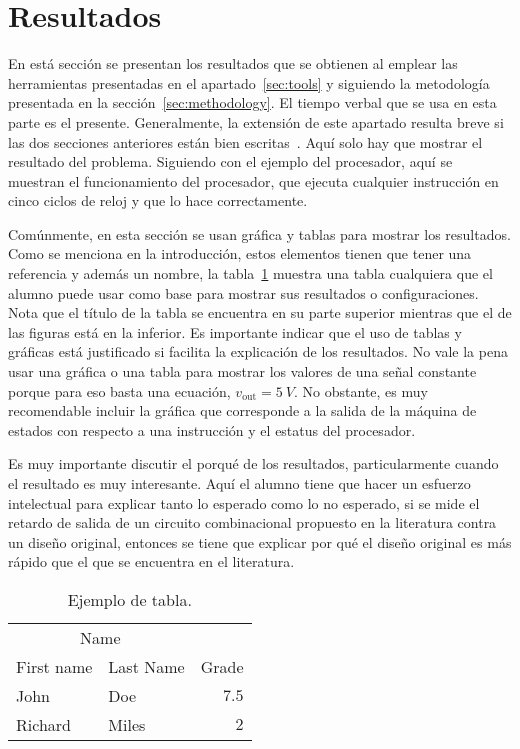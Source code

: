 \documentclass[12pt]{article}
\begin{document}
\section{Resultados}\label{sec:results}

En está sección se presentan los resultados que se obtienen al emplear las 
herramientas presentadas en el apartado~\ref{sec:tools} y siguiendo la 
metodología presentada en la sección~\ref{sec:methodology}. El tiempo verbal 
que se usa en esta parte es el presente. Generalmente, la extensión de este 
apartado resulta breve si las dos secciones anteriores están bien 
escritas~\cite{DaRo05}. Aquí solo hay que mostrar el resultado del problema. 
Siguiendo con el ejemplo del procesador, aquí se muestran el funcionamiento 
del procesador, \eg que ejecuta cualquier instrucción en cinco ciclos de 
reloj y que lo hace correctamente.

Comúnmente, en esta sección se usan gráfica y tablas para mostrar los 
resultados. Como se menciona en la introducción, estos elementos tienen que 
tener una referencia y además un nombre, \eg la tabla~\ref{tab:example} 
muestra una tabla cualquiera que el alumno puede usar como base para mostrar 
sus resultados o configuraciones. Nota que el título de la tabla se encuentra 
en su parte superior mientras que el de las figuras está en la inferior. Es 
importante indicar que el uso de tablas y gráficas está justificado si facilita 
la explicación de los resultados. No vale la pena usar una gráfica o una tabla 
para mostrar los valores de una señal constante porque para eso basta una 
ecuación, \eg $v_\mathrm{out} = \SI{5}{V}$. No obstante, es muy recomendable 
incluir la gráfica que corresponde a la salida de la máquina de estados con 
respecto a una instrucción y el estatus del procesador.

Es muy importante discutir el porqué de los resultados, particularmente cuando 
el resultado es muy interesante. Aquí el alumno tiene que hacer un esfuerzo 
intelectual para explicar tanto lo esperado como lo no esperado, \eg si se 
mide el retardo de salida de un circuito combinacional propuesto en la 
literatura contra un diseño original, entonces se tiene que explicar por qué el 
diseño original es más rápido que el que se encuentra en el literatura.

\begin{table}
   \centering
   \caption{Ejemplo de tabla.}
   \begin{tabular}{llr}
      \toprule
      \multicolumn{2}{c}{Name} \\
      \cmidrule(r){1-2} First name & Last Name & Grade \\ 
      \midrule John & Doe & $7.5$ \\
      Richard & Miles & $2$ \\
      \bottomrule
   \end{tabular}
   \label{tab:example}
\end{table}
\end{document}
